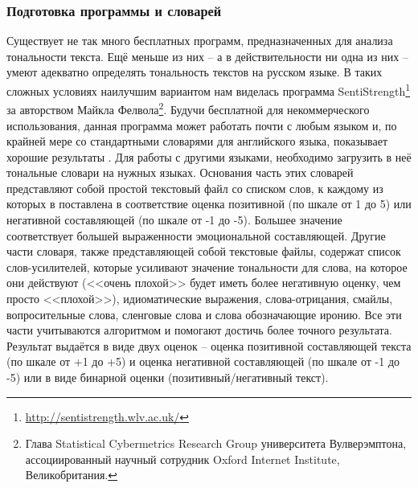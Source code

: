 \subsubsection{Подготовка программы и словарей}
Существует не так много бесплатных программ, предназначенных для анализа тональности текста. Ещё меньше из них -- а в действительности ни одна из них -- умеют адекватно определять тональность текстов на русском языке. В таких сложных условиях наилучшим вариантом нам виделась программа SentiStrength\footnote{\href{http://sentistrength.wlv.ac.uk/ }{http://sentistrength.wlv.ac.uk/}} за авторством Майкла Фелвола\footnote{Глава Statistical Cybermetrics Research Group университета Вулверэмптона, ассоциированный научный сотрудник Oxford Internet Institute, Великобритания.}. Будучи бесплатной для некоммерческого использования, данная программа может работать почти с любым языком и, по крайней мере со стандартными словарями для английского языка, показывает хорошие результаты \cite{SentiStrength}. Для работы с другими языками, необходимо загрузить в неё тональные словари на нужных языках. Основания часть этих словарей представляют собой простой текстовый файл со списком слов, к каждому из которых в поставлена в соответствие оценка позитивной (по шкале от 1 до 5) или негативной составляющей (по шкале от -1 до -5). Большее значение соответствует большей выраженности эмоциональной составляющей. Другие части словаря, также представляющей собой текстовые файлы, содержат список слов-усилителей, которые усиливают значение тональности для слова, на которое они действуют (<<очень плохой>> будет иметь более негативную оценку, чем просто <<плохой>>), идиоматические выражения, слова-отрицания, смайлы, вопросительные слова, сленговые слова и слова обозначающие иронию. Все эти части учитываются алгоритмом и помогают достичь более точного результата. Результат выдаётся в виде двух оценок – оценка позитивной составляющей текста (по шкале от +1 до +5) и оценка негативной составляющей (по шкале от -1 до -5) или в виде бинарной оценки (позитивный/негативный текст).

